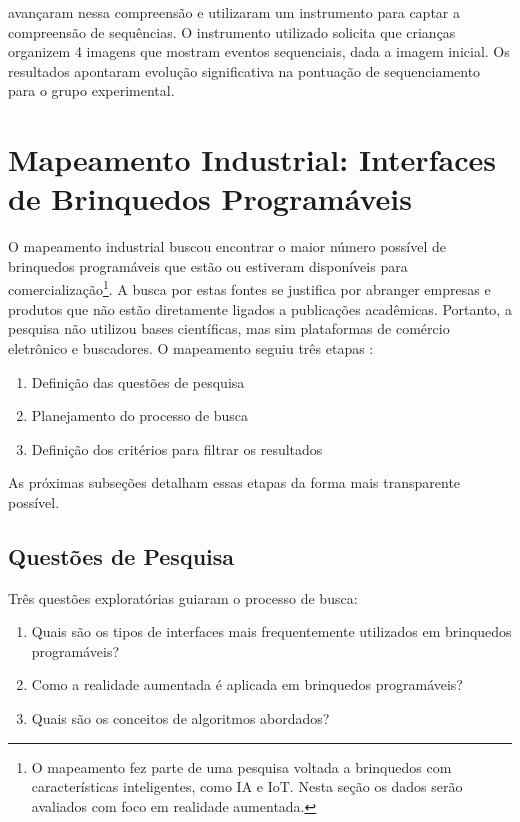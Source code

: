 { avançaram nessa compreensão e utilizaram um instrumento para captar a compreensão de sequências. O instrumento utilizado solicita que crianças organizem 4 imagens que mostram eventos sequenciais, dada a imagem inicial. Os resultados apontaram evolução significativa na pontuação de sequenciamento para o grupo experimental.

\section{Mapeamento Industrial: Interfaces de Brinquedos Programáveis}
\label{secao_mapeamento_industrial}

O mapeamento industrial buscou encontrar o maior número possível de brinquedos programáveis que estão ou estiveram disponíveis para comercialização\footnote{O mapeamento fez parte de uma pesquisa voltada a brinquedos com características inteligentes, como IA e IoT. Nesta seção os dados serão avaliados com foco em realidade aumentada.}. A busca por estas fontes se justifica por abranger empresas e produtos que não estão diretamente ligados a publicações acadêmicas. Portanto, a pesquisa não utilizou bases científicas, mas sim plataformas de comércio eletrônico e buscadores. O mapeamento seguiu três etapas \cite{cooper_alice:_2000}:
\begin{enumerate}
    \item Definição das questões de pesquisa
    \item Planejamento do processo de busca
    \item Definição dos critérios para filtrar os resultados
\end{enumerate}

As próximas subseções detalham essas etapas da forma mais transparente possível.

\subsection{Questões de Pesquisa}

Três questões exploratórias guiaram o processo de busca:

\begin{enumerate}
    \item Quais são os tipos de interfaces mais frequentemente utilizados em brinquedos programáveis?
    \item Como a realidade aumentada é aplicada em brinquedos programáveis?
    \item Quais são os conceitos de algoritmos abordados?
\end{enumerate}

}

